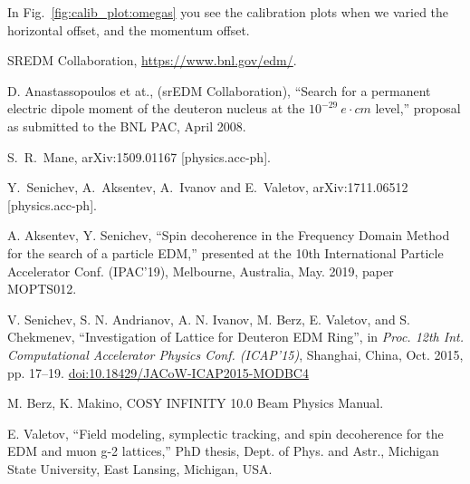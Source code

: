 \documentclass[a4paper]{jacow}
\begin{document}
In Fig.~\ref{fig:calib_plot:omegas} you see the calibration plots when we varied the horizontal 
offset, and the momentum offset.

\begin{thebibliography}{9}

  SREDM Collaboration, \url{https://www.bnl.gov/edm/}.

  D. Anastassopoulos et at., (srEDM Collaboration), ``Search for a permanent electric dipole moment of
  the deuteron nucleus at the $10^{-29}~e\cdot cm$ level,'' proposal as submitted to the BNL PAC, April 2008.

  S.~R.~Mane,
  arXiv:1509.01167 [physics.acc-ph].
  
  Y.~Senichev, A.~Aksentev, A.~Ivanov and E.~Valetov,
  arXiv:1711.06512 [physics.acc-ph].


  A. Aksentev, Y. Senichev, ``Spin decoherence in the Frequency Domain Method for the search of a particle EDM,''
  presented at the 10th International Particle Accelerator Conf. (IPAC’19), Melbourne, Australia,
  May. 2019, paper MOPTS012.

   V. Senichev, S. N. Andrianov, A. N. Ivanov, M. Berz, E. Valetov, and S. Chekmenev,
   \textquotedblleft{Investigation of Lattice for Deuteron EDM Ring}\textquotedblright,
   in \emph{Proc. 12th Int. Computational Accelerator Physics Conf. (ICAP'15)}, Shanghai, China, Oct. 2015,
   pp. 17--19. \url{doi:10.18429/JACoW-ICAP2015-MODBC4} 

  M. Berz, K. Makino, COSY INFINITY 10.0 Beam Physics Manual.

  E. Valetov, ``Field modeling, symplectic tracking, and spin decoherence for the EDM and muon g-2 lattices,''
  PhD thesis, Dept. of Phys. and Astr., Michigan State University, East Lansing, Michigan, USA.
  
\end{thebibliography}
\end{document}
